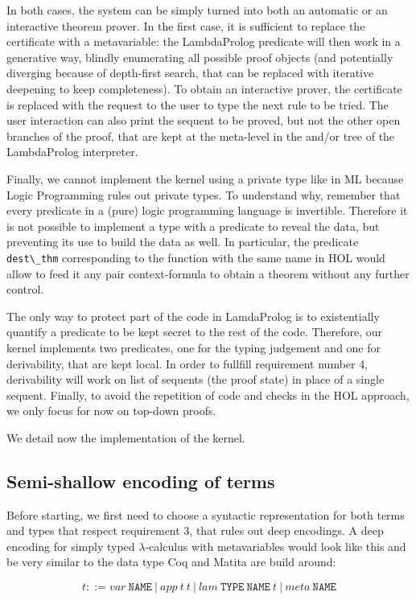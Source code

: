 \documentclass[preprint]{sigplanconf}
\begin{document}
In both cases, the system can be simply turned into both an automatic or an interactive theorem prover. In the first case, it is sufficient to replace the certificate with a metavariable: the LambdaProlog predicate will then work in a generative way, blindly enumerating all possible proof objects (and potentially diverging because of depth-first search, that can be replaced with iterative deepening to keep completeness). To obtain an interactive prover, the certificate is replaced with the request to the user to type the next rule to be tried. The user interaction can also print the sequent to be proved, but not the other open branches of the proof, that are kept at the meta-level in the and/or tree of the LambdaProlog interpreter.

Finally, we cannot implement the kernel using a private type like in ML because Logic Programming rules out private types. To understand why, remember that every predicate in a (pure) logic programming language is invertible. Therefore it is not possible to implement a type with a predicate to reveal the data, but preventing its use to build the data as well. In particular, the predicate \verb+dest\_thm+ corresponding to the function with the same name in HOL would allow to feed it any pair context-formula to obtain a theorem without any further control.

The only way to protect part of the code in LamdaProlog is to existentially quantify a predicate to be kept secret to the rest of the code. Therefore, our kernel implements two predicates, one for the typing judgement and one for derivability, that are kept local. In order to fullfill requirement number 4, derivability will work on list of sequents (the proof state) in place of a single sequent. Finally, to avoid the repetition of code and checks in the HOL approach, we only focus for now on top-down proofs.

We detail now the implementation of the kernel.

\subsection{Semi-shallow encoding of terms}
Before starting, we first need to choose a syntactic representation for both
terms and types that respect requirement 3, that rules out deep encodings.
A deep encoding for simply typed $\lambda$-calculus with metavariables would
look like this and be very similar to the data type Coq and Matita are build around:

$$ t ::= var~\mathtt{NAME} ~|~ app~t~t ~|~ lam~\mathtt{TYPE}~\mathtt{NAME}~t ~|~ meta~\mathtt{NAME}$$
\end{document}
